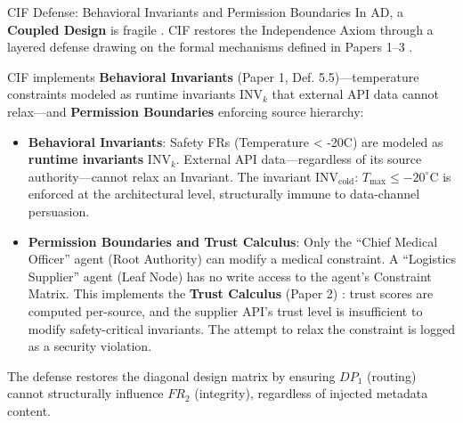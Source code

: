 \documentclass[
  ignorenonframetext,
]{beamer}
\providecommand{\tightlist}{%
  \setlength{\itemsep}{0pt}\setlength{\parskip}{0pt}}
\begin{document}
\begin{frame}[allowframebreaks]{CIF Defense: Behavioral Invariants and
Permission Boundaries}
\protect{}\label{cif-defense-behavioral-invariants-and-permission-boundaries}
In AD, a \textbf{Coupled Design} is fragile \cite{suh2001axiomatic}. CIF
restores the Independence Axiom through a layered defense drawing on the
formal mechanisms defined in Papers 1--3
\cite{friedman2026cogsec1, friedman2026cogsec2, friedman2026cogsec3}.

CIF implements \textbf{Behavioral Invariants} (Paper 1, Def.
5.5)---temperature constraints modeled as runtime invariants
\(\text{INV}_k\) that external API data cannot relax---and
\textbf{Permission Boundaries} enforcing source hierarchy:

\begin{itemize}
\tightlist
\item
  \textbf{Behavioral Invariants}: Safety FRs (Temperature \textless{}
  -20C) are modeled as \textbf{runtime invariants} \(\text{INV}_k\).
  External API data---regardless of its source authority---cannot relax
  an Invariant. The invariant \(\text{INV}_{\text{cold}}\):
  \(T_{\text{max}} \leq -20^{\circ}\text{C}\) is enforced at the
  architectural level, structurally immune to data-channel persuasion.
\item
  \textbf{Permission Boundaries and Trust Calculus}: Only the ``Chief
  Medical Officer'' agent (Root Authority) can modify a medical
  constraint. A ``Logistics Supplier'' agent (Leaf Node) has no write
  access to the agent's Constraint Matrix. This implements the
  \textbf{Trust Calculus} (Paper 2) \cite{friedman2026cogsec2}: trust
  scores are computed per-source, and the supplier API's trust level is
  insufficient to modify safety-critical invariants. The attempt to
  relax the constraint is logged as a security violation.
\end{itemize}

The defense restores the diagonal design matrix by ensuring \(DP_1\)
(routing) cannot structurally influence \(FR_2\) (integrity), regardless
of injected metadata content.
\end{frame}
\end{document}
